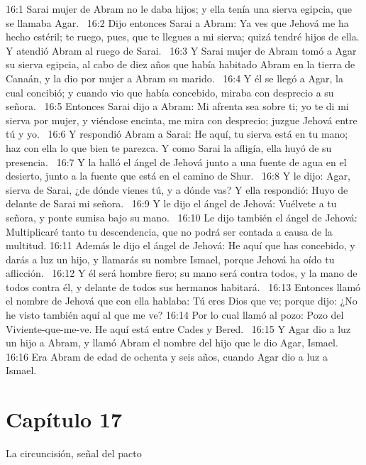 16:1 Sarai mujer de Abram no le daba hijos; y ella tenía una sierva egipcia, que se llamaba Agar.  
16:2 Dijo entonces Sarai a Abram: Ya ves que Jehová me ha hecho estéril; te ruego, pues, que te llegues a mi sierva; quizá tendré hijos de ella. Y atendió Abram al ruego de Sarai.  
16:3 Y Sarai mujer de Abram tomó a Agar su sierva egipcia, al cabo de diez años que había habitado Abram en la tierra de Canaán, y la dio por mujer a Abram su marido.  
16:4 Y él se llegó a Agar, la cual concibió; y cuando vio que había concebido, miraba con desprecio a su señora.  
16:5 Entonces Sarai dijo a Abram: Mi afrenta sea sobre ti; yo te di mi sierva por mujer, y viéndose encinta, me mira con desprecio; juzgue Jehová entre tú y yo.  
16:6 Y respondió Abram a Sarai: He aquí, tu sierva está en tu mano; haz con ella lo que bien te parezca. Y como Sarai la afligía, ella huyó de su presencia.  
16:7 Y la halló el ángel de Jehová junto a una fuente de agua en el desierto, junto a la fuente que está en el camino de Shur.  
16:8 Y le dijo: Agar, sierva de Sarai, ¿de dónde vienes tú, y a dónde vas? Y ella respondió: Huyo de delante de Sarai mi señora.  
16:9 Y le dijo el ángel de Jehová: Vuélvete a tu señora, y ponte sumisa bajo su mano.  
16:10 Le dijo también el ángel de Jehová: Multiplicaré tanto tu descendencia, que no podrá ser contada a causa de la multitud. 
16:11 Además le dijo el ángel de Jehová: He aquí que has concebido, y darás a luz un hijo, y llamarás su nombre Ismael, porque Jehová ha oído tu aflicción.  
16:12 Y él será hombre fiero; su mano será contra todos, y la mano de todos contra él, y delante de todos sus hermanos habitará.  
16:13 Entonces llamó el nombre de Jehová que con ella hablaba: Tú eres Dios que ve; porque dijo: ¿No he visto también aquí al que me ve? 
16:14 Por lo cual llamó al pozo: Pozo del Viviente-que-me-ve. He aquí está entre Cades y Bered.  
16:15 Y Agar dio a luz un hijo a Abram, y llamó Abram el nombre del hijo que le dio Agar, Ismael.  
16:16 Era Abram de edad de ochenta y seis años, cuando Agar dio a luz a Ismael.  
\section*{Capítulo 17 }
La circuncisión, señal del pacto  

